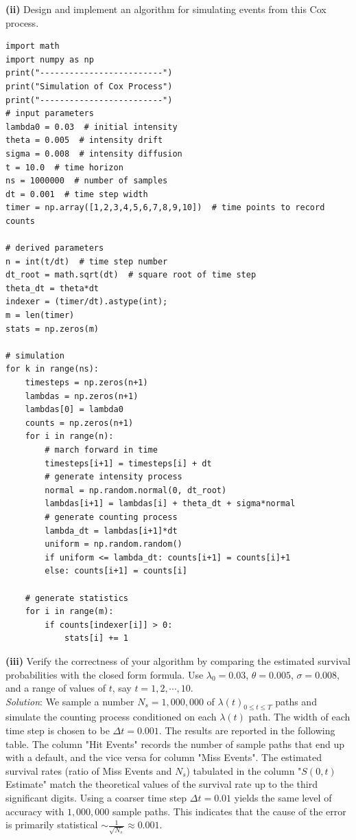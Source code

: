 \documentclass[paper=a4, fontsize=11pt]{scrartcl} %
\numberwithin{equation}{section} %
\numberwithin{figure}{section} %
\numberwithin{table}{section} %
\begin{document}
\textbf{(ii)} Design and implement an algorithm for simulating events from
this Cox process.
\begin{lstlisting}
import math
import numpy as np
print("-------------------------")
print("Simulation of Cox Process")
print("-------------------------")
# input parameters
lambda0 = 0.03  # initial intensity
theta = 0.005  # intensity drift
sigma = 0.008  # intensity diffusion
t = 10.0  # time horizon
ns = 1000000  # number of samples
dt = 0.001  # time step width
timer = np.array([1,2,3,4,5,6,7,8,9,10])  # time points to record counts
     
# derived parameters
n = int(t/dt)  # time step number
dt_root = math.sqrt(dt)  # square root of time step
theta_dt = theta*dt      
indexer = (timer/dt).astype(int);
m = len(timer)
stats = np.zeros(m)

# simulation
for k in range(ns):
    timesteps = np.zeros(n+1)
    lambdas = np.zeros(n+1)
    lambdas[0] = lambda0
    counts = np.zeros(n+1)
    for i in range(n):
        # march forward in time
        timesteps[i+1] = timesteps[i] + dt
        # generate intensity process 
        normal = np.random.normal(0, dt_root)
        lambdas[i+1] = lambdas[i] + theta_dt + sigma*normal
        # generate counting process
        lambda_dt = lambdas[i+1]*dt
        uniform = np.random.random()
        if uniform <= lambda_dt: counts[i+1] = counts[i]+1
        else: counts[i+1] = counts[i]
        
    # generate statistics
    for i in range(m):
        if counts[indexer[i]] > 0:
            stats[i] += 1
\end{lstlisting}

\textbf{(iii)} Verify the correctness of your algorithm by comparing the estimated survival
probabilities with the closed form formula. Use $\lambda_0=0.03$, $\theta=0.005$, 
$\sigma=0.008$, and a range of values of $t$, say $t=1,2,\cdots, 10$.\\
\textit{Solution}: We sample a number $N_s = 1,000,000$ of $\lambda(t)_{0\le t\le T}$ paths and simulate
the counting process conditioned on each $\lambda(t)$ path. The width of each time step
is chosen to be $\Delta t = 0.001$. The results are reported in the following table. 
The column "Hit Events" records the number of
sample paths that end up with a default, and the vice versa for column "Miss Events".
The estimated survival rates (ratio of Miss Events and $N_s$) tabulated in the column "$S(0,t)$ Estimate" match the theoretical
values of the survival rate up to the third significant digits. Using a coarser time step $\Delta t=0.01$
yields the same level of accuracy with $1,000,000$ sample paths. This indicates that the cause 
of the error is primarily statistical $\sim\frac{1}{\sqrt{N_s}}\approx 0.001$.
\begin{center}
{
}
\end{center}
\end{document}
